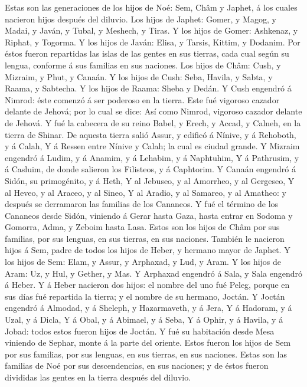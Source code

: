  Estas son las generaciones de los hijos de Noé: Sem, Châm
y Japhet, á los cuales nacieron hijos después del diluvio.
 Los hijos de Japhet: Gomer, y Magog, y Madai, y Javán, y
Tubal, y Meshech, y Tiras.  Y los hijos de Gomer:
Ashkenaz, y Riphat, y Togorma.  Y los hijos de Javán:
Elisa, y Tarsis, Kittim, y Dodanim.  Por éstos fueron
repartidas las islas de las gentes en sus tierras, cada cual según su
lengua, conforme á sus familias en sus naciones.  Los
hijos de Châm: Cush, y Mizraim, y Phut, y Canaán.  Y los
hijos de Cush: Seba, Havila, y Sabta, y Raama, y Sabtecha. Y los hijos
de Raama: Sheba y Dedán.  Y Cush engendró á Nimrod: éste
comenzó á ser poderoso en la tierra.  Este fué vigoroso
cazador delante de Jehová; por lo cual se dice: Así como Nimrod,
vigoroso cazador delante de Jehová.  Y fué la cabecera de
su reino Babel, y Erech, y Accad, y Calneh, en la tierra de Shinar.
 De aquesta tierra salió Assur, y edificó á Nínive, y á
Rehoboth, y á Calah,  Y á Ressen entre Nínive y Calah; la
cual es ciudad grande.  Y Mizraim engendró á Ludim, y á
Anamim, y á Lehabim, y á Naphtuhim,  Y á Pathrusim, y á
Casluim, de donde salieron los Filisteos, y á Caphtorim. 
Y Canaán engendró á Sidón, su primogénito, y á Heth,  Y
al Jebuseo, y al Amorrheo, y al Gergeseo,  Y al Heveo, y
al Araceo, y al Sineo,  Y al Aradio, y al Samareo, y al
Amatheo: y después se derramaron las familias de los Cananeos.
 Y fué el término de los Cananeos desde Sidón, viniendo á
Gerar hasta Gaza, hasta entrar en Sodoma y Gomorra, Adma, y Zeboim hasta
Lasa.  Estos son los hijos de Châm por sus familias, por
sus lenguas, en sus tierras, en sus naciones.  También le
nacieron hijos á Sem, padre de todos los hijos de Heber, y hermano mayor
de Japhet.  Y los hijos de Sem: Elam, y Assur, y
Arphaxad, y Lud, y Aram.  Y los hijos de Aram: Uz, y Hul,
y Gether, y Mas.  Y Arphaxad engendró á Sala, y Sala
engendró á Heber.  Y á Heber nacieron dos hijos: el
nombre del uno fué Peleg, porque en sus días fué repartida la tierra; y
el nombre de su hermano, Joctán.  Y Joctán engendró á
Almodad, y á Sheleph, y Hazarmaveth, y á Jera,  Y á
Hadoram, y á Uzal, y á Dicla,  Y á Obal, y á Abimael, y á
Seba,  Y á Ophir, y á Havila, y á Jobad: todos estos
fueron hijos de Joctán.  Y fué su habitación desde Mesa
viniendo de Sephar, monte á la parte del oriente.  Estos
fueron los hijos de Sem por sus familias, por sus lenguas, en sus
tierras, en sus naciones.  Estas son las familias de Noé
por sus descendencias, en sus naciones; y de éstos fueron divididas las
gentes en la tierra después del diluvio.


